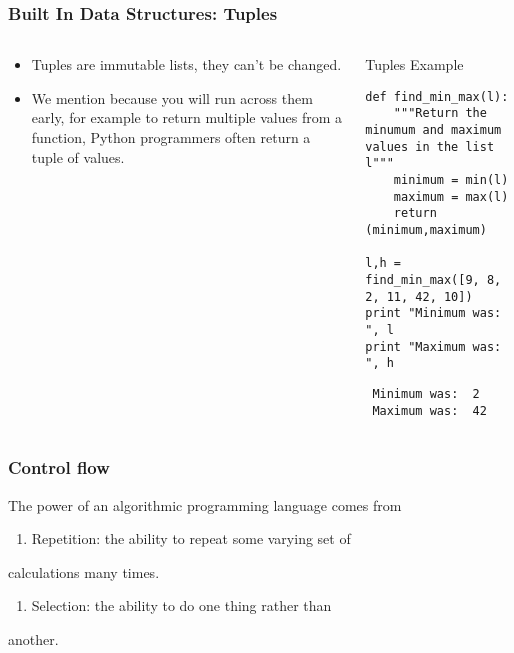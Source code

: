 \documentclass[bigger]{beamer}
\begin{document}
\begin{frame}[fragile]
\frametitle{Built In Data Structures: Tuples}
\label{sec-1-7}
\begin{columns}
\begin{column}{0.4\textwidth}
\label{sec-1-7-1}

\begin{itemize}
\item Tuples are immutable lists, they can't be changed.
\item We mention because you will run across them early, for example to return 
     multiple values from a function, Python programmers often return a tuple of values.
\end{itemize}
\end{column}
\begin{column}{0.6\textwidth}
\begin{block}{Tuples Example}
\label{sec-1-7-2}

\fontsize{6}{7.2}\selectfont

\begin{verbatim}
def find_min_max(l):
    """Return the minumum and maximum values in the list l"""
    minimum = min(l)
    maximum = max(l)
    return (minimum,maximum)

l,h = find_min_max([9, 8, 2, 11, 42, 10])
print "Minimum was: ", l
print "Maximum was: ", h
\end{verbatim}

\begin{verbatim}
 Minimum was:  2
 Maximum was:  42
\end{verbatim}
\end{block}
\end{column}
\end{columns}
\end{frame}
\begin{frame}
\frametitle{Control flow}
\label{sec-1-8}


The power of an algorithmic programming language comes from

\begin{enumerate}
\item Repetition: the ability to repeat some varying set of
\end{enumerate}
calculations many times.
\begin{enumerate}
\item Selection: the ability to do one thing rather than
\end{enumerate}
another.
\end{frame}
\end{document}
